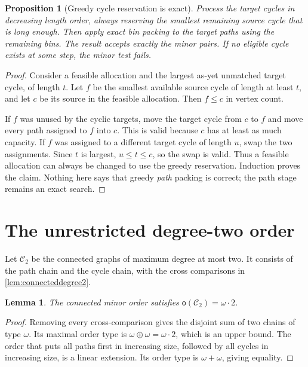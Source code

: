 \documentclass[11pt,letterpaper]{article}
\theoremstyle{plain}
\newtheorem{lemma}[lemma]{Lemma}
\newtheorem{proposition}[proposition]{Proposition}
\theoremstyle{definition}
\theoremstyle{remark}
\newcommand{\mot}{\mathsf o}
\newcommand{\Cl}{\mathcal C}
\begin{document}
\begin{proposition}[Greedy cycle reservation is exact]\label{prop:greedy}
Process the target cycles in decreasing length order, always reserving
the smallest remaining source cycle that is long enough. Then apply
\emph{exact} bin packing to the target paths using the remaining bins.
The result accepts exactly the minor pairs. If no eligible cycle exists
at some step, the minor test fails.
\end{proposition}

\begin{proof}
Consider a feasible allocation and the largest as-yet unmatched target
cycle, of length $t$. Let $f$ be the smallest available source cycle
of length at least $t$, and let $c$ be its source in the feasible
allocation. Then $f\le c$ in vertex count.

If $f$ was unused by the cyclic targets, move the target cycle from
$c$ to $f$ and move every path assigned to $f$ into $c$. This is valid
because $c$ has at least as much capacity. If $f$ was assigned to a
different target cycle of length $u$, swap the two assignments. Since
$t$ is largest, $u\le t\le c$, so the swap is valid. Thus a feasible
allocation can always be changed to use the greedy reservation.
Induction proves the claim. Nothing here says that greedy \emph{path}
packing is correct; the path stage remains an exact search.
\end{proof}

\section{The unrestricted degree-two order}\label{sec:unbounded}

Let $\Cl_2$ be the connected graphs of maximum degree at most two.
It consists of the path chain and the cycle chain, with the cross
comparisons in \cref{lem:connecteddegree2}.

\begin{lemma}\label{lem:connectedmot}
The connected minor order satisfies $\mot(\Cl_2)=\omega\cdot2$.
\end{lemma}

\begin{proof}
Removing every cross-comparison gives the disjoint sum of two chains
of type $\omega$. Its maximal order type is
$\omega\oplus\omega=\omega\cdot2$, which is an upper bound.
The order that puts all paths first in increasing size, followed by
all cycles in increasing size, is a linear extension. Its order type
is $\omega+\omega$, giving equality.
\end{proof}
\end{document}
